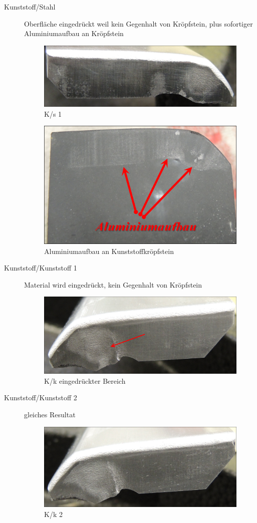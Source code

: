 \documentclass[12pt,a4paper,parskip,twoside,BCOR5mm,headsepline]{scrartcl}
\begin{document}
\begin{description*}
\begin{description}
\item[Kunststoff/Stahl] Oberfläche eingedrückt weil kein Gegenhalt von Kröpfstein, plus sofortiger Aluminiumaufbau an Kröpfstein
\begin{figure}[H]
\centering
\includegraphics[width=.8\textwidth]{Ks1}
\caption{K/s 1}
\label{fig:Ks1}
\end{figure}
\begin{figure}[H]
\centering
\includegraphics[width=.8\textwidth]{SteinKAlubau}
\caption{Aluminiumaufbau an Kunststoffkröpfstein}
\label{fig:SteinKAlubau}
\end{figure}

\item[Kunststoff/Kunststoff 1] Material wird eingedrückt, kein Gegenhalt von Kröpfstein
\begin{figure}[H]
\centering
\includegraphics[width=.8\textwidth]{Kk1a}
\caption{K/k eingedrückter Bereich}
\label{fig:Kk}
\end{figure}

\item[Kunststoff/Kunststoff 2] gleiches Resultat
\begin{figure}[H]
\centering
\includegraphics[width=.8\textwidth]{Kk2}
\caption{K/k 2}
\label{fig:Kb1a}
\end{figure}


\end{description}
\end{description*}
\end{document}
